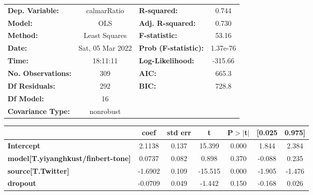 \begin{center}
\begin{tabular}{lclc}
\toprule
\textbf{Dep. Variable:}                    &   calmarRatio    & \textbf{  R-squared:         } &     0.744   \\
\textbf{Model:}                            &       OLS        & \textbf{  Adj. R-squared:    } &     0.730   \\
\textbf{Method:}                           &  Least Squares   & \textbf{  F-statistic:       } &     53.16   \\
\textbf{Date:}                             & Sat, 05 Mar 2022 & \textbf{  Prob (F-statistic):} &  1.37e-76   \\
\textbf{Time:}                             &     18:11:11     & \textbf{  Log-Likelihood:    } &   -315.66   \\
\textbf{No. Observations:}                 &         309      & \textbf{  AIC:               } &     665.3   \\
\textbf{Df Residuals:}                     &         292      & \textbf{  BIC:               } &     728.8   \\
\textbf{Df Model:}                         &          16      & \textbf{                     } &             \\
\textbf{Covariance Type:}                  &    nonrobust     & \textbf{                     } &             \\
\bottomrule
\end{tabular}
\begin{tabular}{lcccccc}
                                           & \textbf{coef} & \textbf{std err} & \textbf{t} & \textbf{P$> |$t$|$} & \textbf{[0.025} & \textbf{0.975]}  \\
\midrule
\textbf{Intercept}                         &       2.1138  &        0.137     &    15.399  &         0.000        &        1.844    &        2.384     \\
\textbf{model[T.yiyanghkust/finbert-tone]} &       0.0737  &        0.082     &     0.898  &         0.370        &       -0.088    &        0.235     \\
\textbf{source[T.Twitter]}                 &      -1.6902  &        0.109     &   -15.515  &         0.000        &       -1.905    &       -1.476     \\
\textbf{dropout}                           &      -0.0709  &        0.049     &    -1.442  &         0.150        &       -0.168    &        0.026     \\

\end{tabular}
\end{center}
